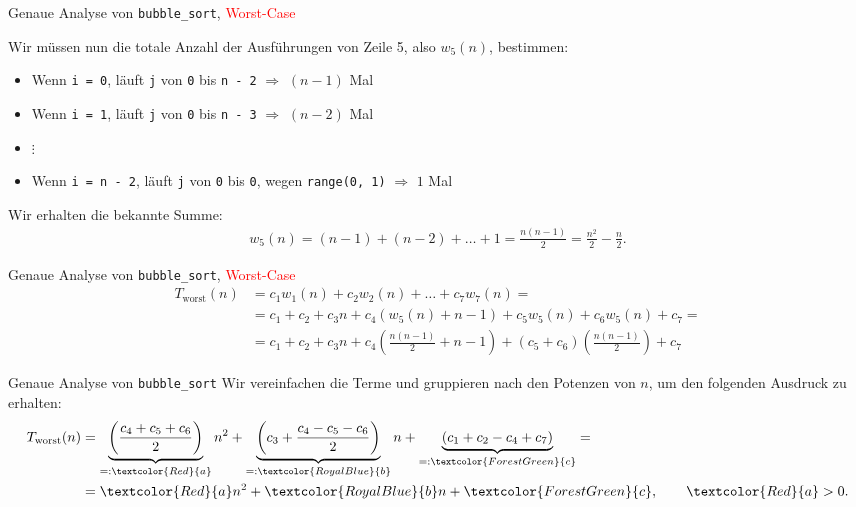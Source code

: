\begin{frame}[fragile]{Genaue Analyse von \texttt{bubble\_sort}, \textcolor{Red}{Worst-Case}}

{\footnotesize
Wir müssen nun die totale Anzahl der Ausführungen von Zeile 5, also $w_5(n)$, bestimmen:
\pause
\begin{itemize}[<+->]
	\item Wenn \lstinline{i = 0}, läuft \lstinline{j} von \lstinline{0} bis \lstinline{n - 2} $\Rightarrow$ $(n-1)$ Mal
	\item Wenn \lstinline{i = 1}, läuft \lstinline{j} von \lstinline{0} bis \lstinline{n - 3} $\Rightarrow$ $(n-2)$ Mal
	\item $\vdots$
	\item Wenn \lstinline{i = n - 2}, läuft \lstinline{j} von \lstinline{0} bis \lstinline{0}, wegen \lstinline{range(0, 1)} $\Rightarrow$ $1$ Mal
\end{itemize}
\pause
Wir erhalten die bekannte Summe:
{\scriptsize
\begin{align*}
	w_5(n) = (n-1) + (n-2) + \ldots + 1 = \frac{n(n-1)}{2} = \frac{n^2}{2} - \frac{n}{2}.
\end{align*}
}
}
\end{frame}

\begin{frame}[fragile]{Genaue Analyse von \texttt{bubble\_sort}, \textcolor{Red}{Worst-Case}}
\phantom{1}
{\footnotesize
\begin{align*}
	T_{\text{worst}}(n) &= c_1w_1(n) + c_2w_2(n) + \ldots + c_7w_7(n) = \\
	&= c_1 + c_2 + c_3n + c_4\left(w_5(n) + n-1\right) + c_5w_5(n) + c_6w_5(n) + c_7 = \\
	&= c_1 + c_2 + c_3n + c_4\left(\frac{n(n-1)}{2}+n-1\right) + (c_5+c_6)\left(\frac{n(n-1)}{2}\right) + c_7
\end{align*}
}
\end{frame}

\begin{frame}[fragile]{Genaue Analyse von \texttt{bubble\_sort}}
	Wir vereinfachen die Terme und gruppieren nach den Potenzen von $n$, um den folgenden Ausdruck zu erhalten:
	\pause
{\footnotesize
\begin{align*}
T_{\text{worst}}(n) &= \underbrace{\left(\frac{c_4 + c_5 + c_6}{2}\right)}_{=:\textcolor{Red}{a}} n^2 + \underbrace{\left(c_3 + \frac{c_4 - c_5 - c_6}{2}\right)}_{=:\textcolor{RoyalBlue}{b}}n + \underbrace{(c_1 + c_2 - c_4 + c_7)}_{=:\textcolor{ForestGreen}{c}} = \\
&= \textcolor{Red}{a}n^2 + \textcolor{RoyalBlue}{b}n + \textcolor{ForestGreen}{c}, \qquad \textcolor{Red}{a} > 0.
\end{align*}}
\end{frame}

